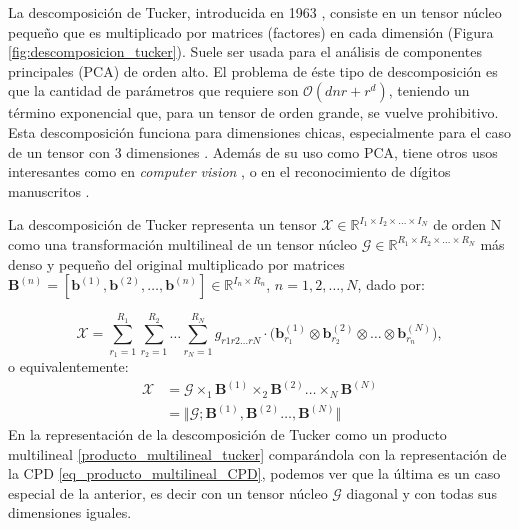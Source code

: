 \documentclass[spanish]{article}
\theoremstyle{definition}
\theoremstyle{remark}
\numberwithin{equation}{section}
\numberwithin{equation}{section} %
\begin{document}
La descomposición de Tucker, introducida en 1963 \cite{tucker1963implications}, consiste en un tensor núcleo pequeño que es multiplicado por matrices (factores) en cada dimensión (Figura \ref{fig:descomposicion_tucker}). Suele ser usada para el análisis de componentes principales (PCA) de orden alto. El problema de éste tipo de descomposición es que la cantidad de parámetros que requiere son $\mathcal{O}(dnr+r^d)$, teniendo un término exponencial que, para un tensor de orden grande, se vuelve prohibitivo. Esta descomposición funciona para dimensiones chicas, especialmente para el caso de un tensor con 3 dimensiones \cite{oseledets2008tucker}. Además de su uso como PCA,  tiene otros usos interesantes como en \textit{computer vision} \cite{vasilescu2002multilinear}, o en el reconocimiento de dígitos manuscritos \cite{savas2007handwritten}. 
\par
La descomposición de Tucker representa un tensor $\mathcal{X} \in \mathbb{R} ^{I_1 \times I_2 \times \ldots \times I_N}$ de orden N  como una transformación multilineal de un tensor núcleo $\mathcal{G} \in \mathbb{R} ^{R_1 \times R_2 \times \ldots \times R_N}$ más denso y pequeño del original multiplicado por matrices $\boldsymbol{B}^{(n)}=[\boldsymbol{b}^{(1)},\boldsymbol{b}^{(2)}, \ldots ,\boldsymbol{b}^{(n)}] \in \mathbb{R} ^{I_n \times R_n}$, $n = 1,2, \ldots ,N$, dado por:   \par
\begin{equation}
\mathcal{X}= \sum_{r_1=1}^{R_1}\sum_{r_2=1}^{R_2} \dots \sum_{r_N=1}^{R_N} g_{r1r2 \ldots rN} \cdot \Big(\boldsymbol{b}_{r_1}^{(1)} \otimes	 \boldsymbol{b}_{r_2}^{(2)} \otimes	  \ldots \otimes	 \boldsymbol{b}_{r_n}^{(N)}\Big),     
\end{equation}
o equivalentemente:
\begin{equation}
\label{producto_multilineal_tucker}
 \begin{split}
\mathcal{X}&
=\mathcal{G} \times_1 \boldsymbol{B}^{(1)} \times_2 \boldsymbol{B}^{(2)}  \ldots \times_N \boldsymbol{B}^{(N)} \\
&=\Big \Vert \mathcal{G};\boldsymbol{B}^{(1)},\boldsymbol{B}^{(2)} \ldots ,\boldsymbol{B}^{(N)} \Big  \Vert 
\end{split}
\end{equation}
En la representación de la descomposición de Tucker como un producto multilineal \eqref{producto_multilineal_tucker} comparándola con la representación de la CPD \eqref{eq_producto_multilineal_CPD}, podemos ver que la última es un caso especial de la anterior, es decir con un  tensor núcleo $\mathcal{G}$  diagonal y con todas sus dimensiones iguales. 
\end{document}
